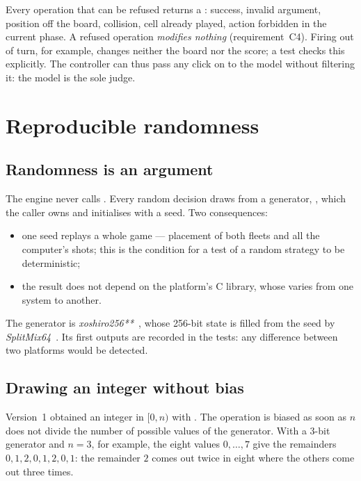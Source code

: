 Every operation that can be refused returns a : success, invalid argument,
position off the board, collision, cell already played, action forbidden in the current
phase. A refused operation \emph{modifies nothing} (requirement~C4). Firing out of turn, for
example, changes neither the board nor the score; a test checks this explicitly. The
controller can thus pass any click on to the model without filtering it: the model is the
sole judge.

\section{Reproducible randomness}
\label{sec-hasard}

\subsection{Randomness is an argument}

The engine never calls . Every random decision draws from a generator,
, which the caller owns and initialises with a seed. Two consequences:

\begin{itemize}
    \item one seed replays a whole game --- placement of both fleets and all the computer's
          shots; this is the condition for a test of a random strategy to be deterministic;
    \item the result does not depend on the platform's C library, whose  varies
          from one system to another.
\end{itemize}

The generator is \emph{xoshiro256**}~\cite{blackman2021}, whose 256-bit state is filled from
the seed by \emph{SplitMix64}~\cite{steele2014}. Its first outputs are recorded in the tests:
any difference between two platforms would be detected.

\subsection{Drawing an integer without bias}

Version~1 obtained an integer in $[0, n)$ with . The operation is biased as
soon as $n$ does not divide the number of possible values of the generator. With a 3-bit
generator and $n = 3$, for example, the eight values $0, \dots, 7$ give the remainders
$0, 1, 2, 0, 1, 2, 0, 1$: the remainder $2$ comes out twice in eight where the others come
out three times.

